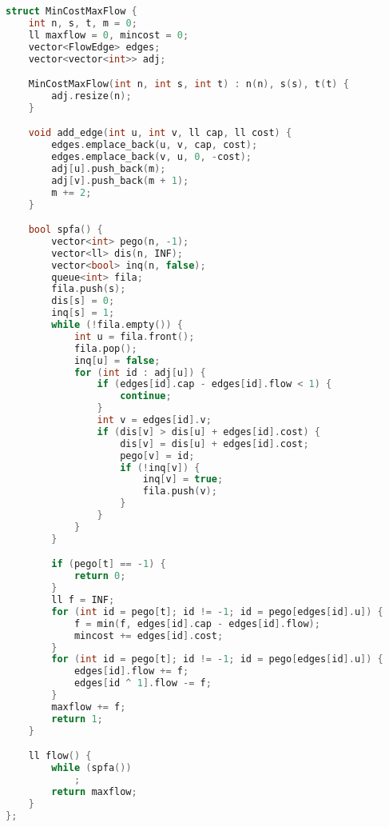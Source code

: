 \documentclass[11pt, a4paper, oneside]{book}
\begin{document}
\begin{multicols}{2}
\begin{lstlisting}[language=C++]
struct MinCostMaxFlow {
    int n, s, t, m = 0;
    ll maxflow = 0, mincost = 0;
    vector<FlowEdge> edges;
    vector<vector<int>> adj;

    MinCostMaxFlow(int n, int s, int t) : n(n), s(s), t(t) {
        adj.resize(n);
    }

    void add_edge(int u, int v, ll cap, ll cost) {
        edges.emplace_back(u, v, cap, cost);
        edges.emplace_back(v, u, 0, -cost);
        adj[u].push_back(m);
        adj[v].push_back(m + 1);
        m += 2;
    }

    bool spfa() {
        vector<int> pego(n, -1);
        vector<ll> dis(n, INF);
        vector<bool> inq(n, false);
        queue<int> fila;
        fila.push(s);
        dis[s] = 0;
        inq[s] = 1;
        while (!fila.empty()) {
            int u = fila.front();
            fila.pop();
            inq[u] = false;
            for (int id : adj[u]) {
                if (edges[id].cap - edges[id].flow < 1) {
                    continue;
                }
                int v = edges[id].v;
                if (dis[v] > dis[u] + edges[id].cost) {
                    dis[v] = dis[u] + edges[id].cost;
                    pego[v] = id;
                    if (!inq[v]) {
                        inq[v] = true;
                        fila.push(v);
                    }
                }
            }
        }

        if (pego[t] == -1) {
            return 0;
        }
        ll f = INF;
        for (int id = pego[t]; id != -1; id = pego[edges[id].u]) {
            f = min(f, edges[id].cap - edges[id].flow);
            mincost += edges[id].cost;
        }
        for (int id = pego[t]; id != -1; id = pego[edges[id].u]) {
            edges[id].flow += f;
            edges[id ^ 1].flow -= f;
        }
        maxflow += f;
        return 1;
    }

    ll flow() {
        while (spfa())
            ;
        return maxflow;
    }
};
\end{lstlisting}
\end{multicols}

\hfill
\end{document}
